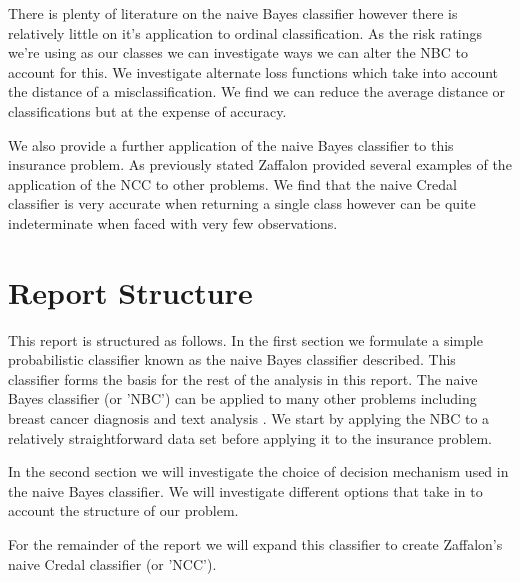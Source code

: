 
There is plenty of literature on the naive Bayes classifier however there is relatively little on it's application to ordinal classification.
As the risk ratings we're using as our classes we can investigate ways we can alter the NBC to account for this.
We investigate alternate loss functions which take into account the distance of a misclassification.
We find we can reduce the average distance or classifications but at the expense of accuracy.

We also provide a further application of the naive Bayes classifier to this insurance problem.
As previously stated Zaffalon provided several examples of the application of the NCC to other problems.
We find that the naive Credal classifier is very accurate when returning a single class however can be quite indeterminate when faced with very few observations.

\section{Report Structure}

This report is structured as follows. In the first section we formulate a simple probabilistic classifier known as the naive Bayes classifier described.
This classifier forms the basis for the rest of the analysis in this report.
The naive Bayes classifier (or 'NBC') can be applied to many other problems including breast cancer diagnosis \cite{Dumitru09} and text analysis \cite{Nigam98}.
We start by applying the NBC to a relatively straightforward data set before applying it to the insurance problem.

In the second section we will investigate the choice of decision mechanism used in the naive Bayes classifier.
We will investigate different options that take in to account the structure of our problem.

For the remainder of the report we will expand this classifier to create Zaffalon's  naive Credal classifier (or 'NCC').

